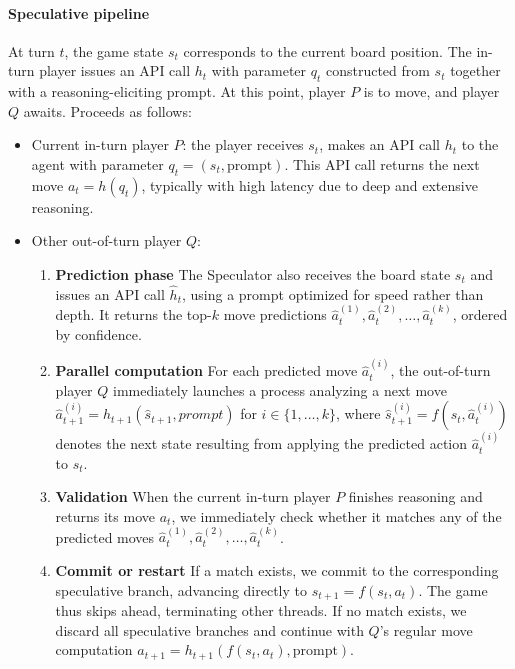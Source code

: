 \paragraph{Speculative pipeline} At turn $t$, the game state $s_t$ corresponds to the current board position. The in-turn player issues an API call $h_t$ with parameter $q_t$ constructed from $s_t$ together with a reasoning-eliciting prompt. At this point, player $P$ is to move, and player $Q$ awaits. Proceeds as follows:
\begin{itemize}[leftmargin=*]
    \item Current in-turn player $P$: the player receives $s_t$, makes an API call $h_t$ to the agent with parameter $q_t = (s_t, \text{prompt})$. This API call returns the next move $a_t = h(q_t)$, typically with high latency due to deep and extensive reasoning.
    \item Other out-of-turn player $Q$:
    \begin{enumerate}
        \item \textbf{Prediction phase} The Speculator also receives the board state $s_t$ and issues an API call $\hat{h}_t$, using a prompt optimized for speed rather than depth. It returns the top-$k$ move predictions $\hat{a}_t^{(1)}, \hat{a}_t^{(2)}, \dots, \hat{a}_t^{(k)}$, ordered by confidence.
        \item \textbf{Parallel computation} For each predicted move $\hat{a}_t^{(i)}$, the out-of-turn player $Q$ immediately launches a process analyzing a next move $\hat{a}_{t+1}^{(i)} = h_{t+1}(\hat{s}_{t+1}, {prompt})$ for $i \in \{1, \ldots, k\}$, where $ \hat{s}_{t+1}^{(i)} = f(s_t,\hat{a}_t^{(i)})$ denotes the next state resulting from applying the predicted action $\hat{a}_t^{(i)}$ to $s_t$. 
        \item \textbf{Validation} When the current in-turn player $P$ finishes reasoning and returns its move $a_t$, we immediately check whether it matches any of the predicted moves $\hat{a}_t^{(1)}, \hat{a}_t^{(2)}, \dots, \hat{a}_t^{(k)}$. 
        \item \textbf{Commit or restart} If a match exists, we commit to the corresponding speculative branch, advancing directly to $s_{t+1} = f(s_t, a_t)$. The game thus skips ahead, terminating other threads. If no match exists, we discard all speculative branches and continue with $Q$’s regular move computation $a_{t+1} = h_{t+1}(f(s_{t},a_t),\text{prompt})$. 
    \end{enumerate}
\end{itemize}


